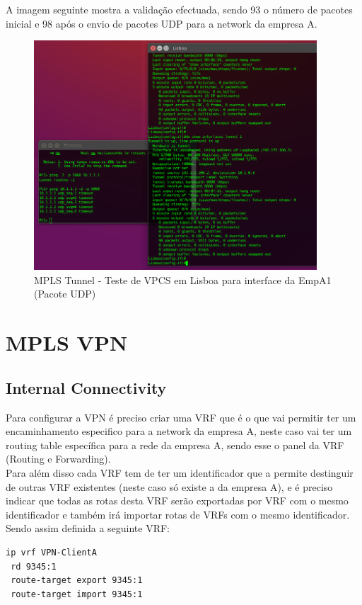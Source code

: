 \documentclass[11pt,a4paper]{report}
\begin{document}
A imagem seguinte mostra a validação efectuada, sendo 93 o número de pacotes inicial e 98 após o envio de pacotes UDP para a network da empresa A.\\

\begin{figure}[H]
\centerline{\includegraphics[width=300pt]{tunnel_mpls.png}}
\caption{MPLS Tunnel - Teste de VPCS em Lisboa para interface da EmpA1 (Pacote UDP)}
\label{schema}
\end{figure}

\section{MPLS VPN}

\subsection{Internal Connectivity}
Para configurar a VPN é preciso criar uma VRF que é o que vai permitir ter um encaminhamento especifico para a network da empresa A, neste caso vai ter um routing table específica para a rede da empresa A, sendo esse o panel da VRF (Routing e Forwarding).\\

Para além disso cada VRF tem de ter um identificador que a permite destinguir de outras VRF existentes (neste caso só existe a da empresa A), e é preciso indicar que todas as rotas desta VRF serão exportadas por VRF com o mesmo identificador e também irá importar rotas de VRFs com o mesmo identificador. Sendo assim definida a seguinte VRF:\\

\begin{lstlisting}[caption=VPN - Criar uma VRF e associar um router distinguisher]
ip vrf VPN-ClientA
 rd 9345:1
 route-target export 9345:1
 route-target import 9345:1
\end{lstlisting}
\end{document}

